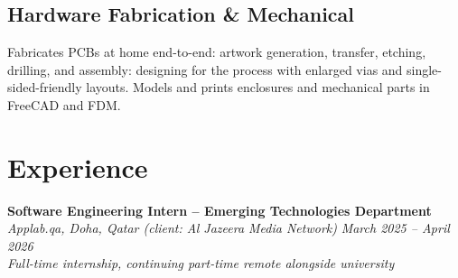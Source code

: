 \documentclass[10pt,a4paper]{article}
\begin{document}
\subsection*{Hardware Fabrication \& Mechanical}
Fabricates PCBs at home end-to-end: artwork generation, transfer, etching,
drilling, and assembly: designing for the process with enlarged vias and
single-sided-friendly layouts. Models and prints enclosures and mechanical parts
in FreeCAD and FDM.\newline


\section*{Experience}
\textbf{Software Engineering Intern -- Emerging Technologies Department}\\
\textit{Applab.qa, Doha, Qatar (client: Al Jazeera Media Network)} \hfill \textit{March 2025 -- April 2026}\\
\textit{Full-time internship, continuing part-time remote alongside university}
\end{document}

